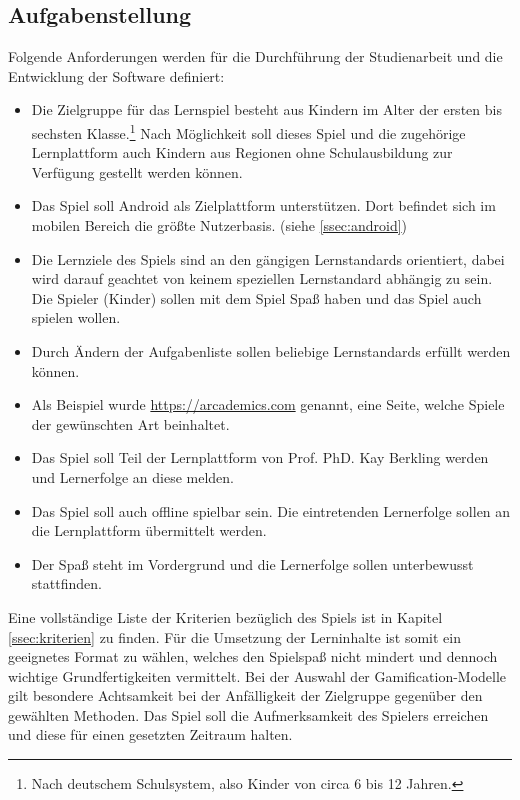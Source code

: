 \subsection{Aufgabenstellung}
	Folgende Anforderungen werden für die Durchführung der Studienarbeit und die Entwicklung der Software definiert:
	\begin{itemize}
		\item{ Die Zielgruppe für das Lernspiel besteht aus Kindern im Alter der ersten bis sechsten Klasse.\footnote{Nach deutschem Schulsystem, also Kinder von circa 6 bis 12 Jahren.} Nach Möglichkeit soll dieses Spiel und die zugehörige Lernplattform auch Kindern aus Regionen ohne Schulausbildung zur Verfügung gestellt werden können. }
		\item{ Das Spiel soll Android als Zielplattform unterstützen. Dort befindet sich im mobilen Bereich die größte Nutzerbasis. (siehe \ref{ssec:android}) }
		\item{ Die Lernziele des Spiels sind an den gängigen Lernstandards orientiert, dabei wird darauf geachtet von keinem speziellen Lernstandard abhängig zu sein. Die Spieler (Kinder) sollen mit dem Spiel Spaß haben und das Spiel auch spielen wollen. }
		\item{ Durch Ändern der Aufgabenliste sollen beliebige Lernstandards erfüllt werden können. }
		\item{ Als Beispiel wurde \url{https://arcademics.com} genannt, eine Seite, welche Spiele der gewünschten Art beinhaltet. }
		\item{ Das Spiel soll Teil der Lernplattform von Prof. PhD. Kay Berkling werden und Lernerfolge an diese melden. }
		\item{ Das Spiel soll auch offline spielbar sein. Die eintretenden Lernerfolge sollen an die Lernplattform übermittelt werden. }
		\item{ Der Spaß steht im Vordergrund und die Lernerfolge sollen unterbewusst stattfinden. }
	\end{itemize}
	Eine vollständige Liste der Kriterien bezüglich des Spiels ist in Kapitel \ref{ssec:kriterien} zu finden.
	Für die Umsetzung der Lerninhalte ist somit ein geeignetes Format zu wählen, welches den Spielspaß nicht mindert und dennoch wichtige Grundfertigkeiten vermittelt.
	Bei der Auswahl der Gamification-Modelle gilt besondere Achtsamkeit bei der Anfälligkeit der Zielgruppe gegenüber den gewählten Methoden. Das Spiel soll die Aufmerksamkeit des Spielers erreichen und diese für einen gesetzten Zeitraum halten.

